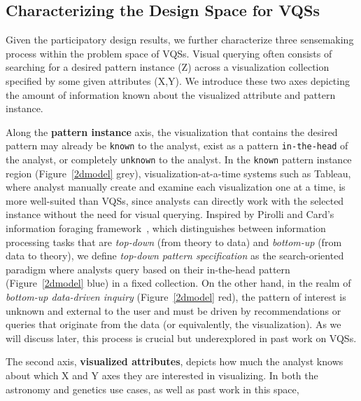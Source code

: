 \subsection{Characterizing the Design Space for VQSs}
Given the participatory design results, 
we further characterize three sensemaking process 
within the problem space of VQSs. 
Visual querying often consists of searching for 
a desired pattern instance (Z) 
across a visualization collection specified by some 
given attributes (X,Y). 
We introduce these two axes depicting the 
amount of information known 
about the visualized attribute and pattern instance.%
\par Along the \textbf{pattern instance} axis, 
the visualization that contains 
the desired pattern may already be \texttt{known} to the analyst, 
exist as a pattern \texttt{in-the-head} of the analyst, 
or completely \texttt{unknown} to the analyst. 
In the \texttt{known} pattern instance region (Figure~\ref{2dmodel} grey), visualization-at-a-time systems such as Tableau, 
where analyst manually create and examine each visualization one at a time, 
is more well-suited than VQSs, since analysts can directly work with the selected instance without the need for visual querying. 
Inspired by Pirolli and Card's information 
foraging framework~\cite{Pirolli}, which distinguishes 
between information processing tasks that are \textit{top-down} 
(from theory to data) and \textit{bottom-up} (from data to theory), 
we define \textit{top-down pattern specification} as the search-oriented paradigm where analysts query based on their 
in-the-head pattern (Figure~\ref{2dmodel} blue) in a fixed collection. 
On the other hand, in the realm of \textit{bottom-up 
data-driven inquiry} (Figure~\ref{2dmodel} red), 
the pattern of interest is unknown and external 
to the user and must be driven by recommendations 
or queries that originate from the data (or equivalently, the visualization). 
As we will discuss later, this process is crucial 
but underexplored in past work on VQSs.
\par The second axis, \textbf{visualized attributes}, 
depicts how much the analyst 
knows about which X and Y axes 
they are interested in visualizing. 
In both the astronomy and genetics use cases, 
as well as past work in this space, 
